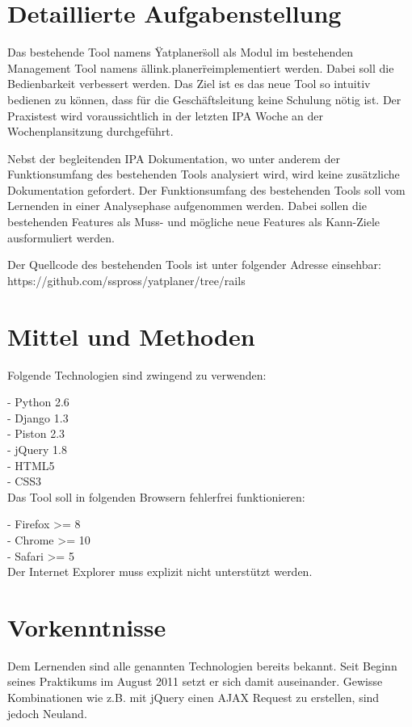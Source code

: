 \section{Detaillierte Aufgabenstellung}
    
Das bestehende Tool namens \"Yatplaner\" soll als Modul im bestehenden Management Tool namens \"allink.planer\" reimplementiert werden. Dabei soll die Bedienbarkeit verbessert werden. Das Ziel ist es das neue Tool so intuitiv bedienen zu können, dass für die Geschäftsleitung keine Schulung nötig ist. Der Praxistest wird voraussichtlich in der letzten IPA Woche an der Wochenplansitzung durchgeführt.

Nebst der begleitenden IPA Dokumentation, wo unter anderem der Funktionsumfang des bestehenden Tools analysiert wird, wird keine zusätzliche Dokumentation gefordert. Der Funktionsumfang des bestehenden Tools soll vom Lernenden in einer Analysephase aufgenommen werden. Dabei sollen die bestehenden Features als Muss- und mögliche neue Features als Kann-Ziele ausformuliert werden.

Der Quellcode des bestehenden Tools ist unter folgender Adresse einsehbar: \\https://github.com/sspross/yatplaner/tree/rails

\section{Mittel und Methoden}
Folgende Technologien sind zwingend zu verwenden:

- Python 2.6\\
- Django 1.3\\
- Piston 2.3\\
- jQuery 1.8\\
- HTML5\\
- CSS3\\

Das Tool soll in folgenden Browsern fehlerfrei funktionieren:

- Firefox >= 8\\
- Chrome >= 10\\
- Safari >= 5\\

Der Internet Explorer muss explizit nicht unterstützt werden.
    
\section{Vorkenntnisse}
Dem Lernenden sind alle genannten Technologien bereits bekannt. Seit Beginn seines Praktikums im August 2011 setzt er sich damit auseinander. Gewisse Kombinationen wie z.B. mit jQuery einen AJAX Request zu erstellen, sind jedoch Neuland. 
    
